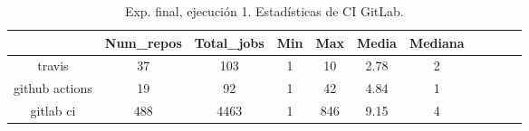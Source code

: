 \begin{table}[h]
  \centering
  \caption{Exp. final, ejecución 1. Estadísticas de CI GitLab.}
  \label{tab:tabla_f_1_5}

\begin{footnotesize}
\renewcommand{\arraystretch}{1.5} %
\begin{tabular}{ccccccccccc}
  \hline
  {} &  Num\_repos &  Total\_jobs &  Min &  Max &  Media &  Mediana \\
  \hline
  travis         &         37 &         103 &    1 &   10 &   2.78 &        2 \\
  github actions &         19 &          92 &    1 &   42 &   4.84 &        1 \\
  gitlab ci      &        488 &        4463 &    1 &  846 &   9.15 &        4 \\
 \end{tabular}
\end{footnotesize}

\end{table}

